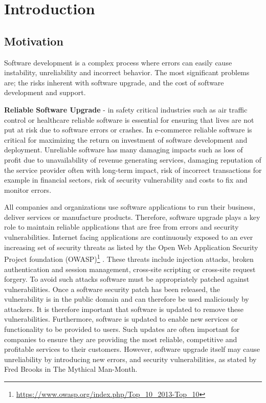 \documentclass[a4paper,11pt,twoside]{report}
\newcommand\blankpage{%
\null
\thispagestyle{empty}%
\addtocounter{page}{-1}%
\newpage}
\begin{document}
\afterpage{\blankpage}
\clearpage

\tableofcontents
\clearpage

\listoffigures
\clearpage

\chapter{Introduction}
\section{Motivation}
Software development is a complex process where errors can easily cause instability, unreliability and incorrect behavior. The most significant problems are; the risks inherent with software upgrade, and the cost of software development and support. 
 
\setlength{\leftskip}{0.5cm}
\setlength{\rightskip}{0.5cm}
\noindent \textbf{Reliable Software Upgrade} - in safety critical industries such as air traffic control or healthcare reliable software is essential for ensuring that lives are not put at risk due to software errors or crashes. In e-commerce reliable software is critical for maximizing the return on investment of software development and deployment. Unreliable software has many damaging impacts such as loss of profit due to unavailability of revenue generating services, damaging reputation of the service provider often with long-term impact, risk of incorrect transactions for example in financial sectors, risk of security vulnerability and costs to fix and monitor errors.

All companies and organizations use software applications to run their business, deliver services or manufacture products. Therefore, software upgrade plays a key role to maintain reliable applications that are free from errors and security vulnerabilities.   Internet facing applications are continuously exposed to an ever increasing set of security threats as listed by the Open Web Application Security Project foundation (OWASP)\footnote{\url{https://www.owasp.org/index.php/Top_10_2013-Top_10}} . These threats include injection attacks, broken authentication and session management, cross-site scripting or cross-site request forgery. To avoid such attacks software must be appropriately patched against vulnerabilities. Once a software security patch has been released, the vulnerability is in the public domain and can therefore be used maliciously by attackers. It is therefore important that software is updated to remove these vulnerabilities.  Furthermore, software is updated to enable new services or functionality to be provided to users. Such updates are often important for companies to ensure they are providing the most reliable, competitive and profitable services to their customers. However, software upgrade itself may cause unreliability by introducing new errors, and security vulnerabilities, as stated by Fred Brooks in The Mythical Man-Month. 
\end{document}
